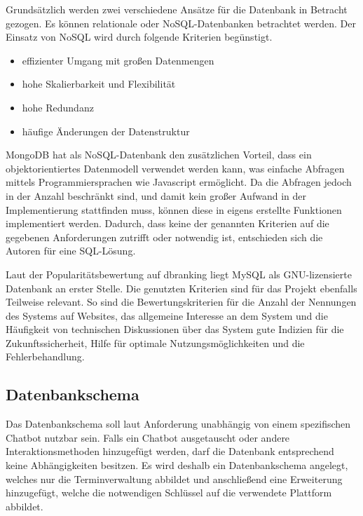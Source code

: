 Grundsätzlich werden zwei verschiedene Ansätze für die Datenbank in Betracht gezogen. Es können relationale oder NoSQL-Datenbanken betrachtet werden. Der Einsatz von NoSQL wird durch folgende Kriterien begünstigt.

\begin{itemize}
	\item effizienter Umgang mit großen Datenmengen
	\item hohe Skalierbarkeit und Flexibilität
	\item hohe Redundanz
	\item häufige Änderungen der Datenstruktur
\end{itemize}

MongoDB hat als NoSQL-Datenbank den zusätzlichen Vorteil, dass ein objektorientiertes Datenmodell verwendet werden kann, was einfache Abfragen mittels Programmiersprachen wie Javascript ermöglicht. Da die Abfragen jedoch in der Anzahl beschränkt sind, und damit kein großer Aufwand in der Implementierung stattfinden muss, können diese in eigens erstellte Funktionen implementiert werden. Dadurch, dass keine der genannten Kriterien auf die gegebenen Anforderungen zutrifft oder notwendig ist, entschieden sich die Autoren für eine SQL-Lösung.

Laut der Popularitätsbewertung auf {dbranking} liegt MySQL als GNU-lizensierte Datenbank an erster Stelle. Die genutzten Kriterien sind für das Projekt ebenfalls Teilweise relevant. So sind die Bewertungskriterien für die Anzahl der Nennungen des Systems auf Websites, das allgemeine Interesse an dem System und die Häufigkeit von technischen Diskussionen über das System gute Indizien für die Zukunftssicherheit, Hilfe für optimale Nutzungsmöglichkeiten und die Fehlerbehandlung.



\subsection{Datenbankschema}

Das Datenbankschema soll laut Anforderung unabhängig von einem spezifischen Chatbot nutzbar sein. Falls ein Chatbot ausgetauscht oder andere Interaktionsmethoden hinzugefügt werden, darf die Datenbank entsprechend keine Abhängigkeiten besitzen. Es wird deshalb ein Datenbankschema angelegt, welches nur die Terminverwaltung abbildet und anschließend eine Erweiterung hinzugefügt, welche die notwendigen Schlüssel auf die verwendete Plattform abbildet.

